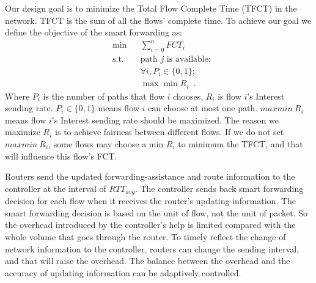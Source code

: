 Our design goal is to minimize the Total Flow Complete Time (TFCT) in the network. TFCT is the sum of all the flows' complete time. To achieve our goal we define the objective of the smart forwarding as:
\begin{equation}
	\begin{aligned}
		& \min &&  \sum_{i=0}^{n} FCT_i \\
		& \text{s.t.}  && \text{path } j \text{ is available};\\
		&              && \forall i, P_i \in \{0,1\};\\
		&              && \max \min  R_i \enspace .
	\end{aligned}
\end{equation}
Where $P_i$ is the number of paths that flow $i$ chooses, $R_i$ is flow $i$'s Interest sending rate. $P_i \in \{0,1\}$ means flow $i$ can choose at most one path. $max min \ R_i$ means flow $i$'s Interest sending rate should be maximized. The reason we maximize $R_i$ is to achieve fairness between different flows. If we do not set $max min \ R_i$, some flows may choose a min $R_i$ to minimum the TFCT, and that will influence this flow's FCT.

Routers send the updated forwarding-assistance and route information to the controller at the interval of $RTT_{avg}$. The controller sends back smart forwarding decision for each flow when it receives the router's updating information. The smart forwarding decision is based on the unit of flow, not the unit of packet. So the overhead introduced by the controller's help is limited compared with the whole volume that goes through the router. To timely reflect the change of network information to the controller, routers can change the sending interval, and that will raise the overhead. The balance between the overhead and the accuracy of updating information can be adaptively controlled.

